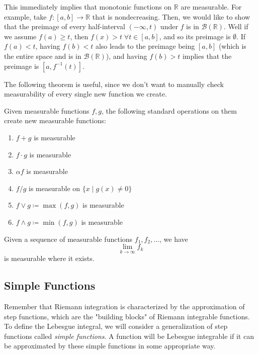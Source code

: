   This immediately implies that monotonic functions on $\mathbb{R}$ are measurable. For example, take $f: [a, b] \longrightarrow \mathbb{R}$ that is nondecreasing. Then, we would like to show that the preimage of every half-interval $(-\infty, t)$ under $f$ is in $\mathcal{B}(\mathbb{R})$. Well if we assume $f(a) \geq t$, then $f(x) > t \; \forall t \in [a, b]$, and so its preimage is $\emptyset$. If $f(a) < t$, having $f(b) < t$ also leads to the preimage being $[a, b]$ (which is the entire space and is in $\mathcal{B}(\mathbb{R})$), and having $f(b) > t$ implies that the preimage is $[a, f^{-1}(t)]$. 

  The following theorem is useful, since we don't want to manually check measurability of every single new function we create. 

  \begin{theorem}
    Given measurable functions $f, g$, the following standard operations on them create new measurable functions: 
    \begin{enumerate}
      \item $f + g$ is measurable 
      \item $f \cdot g$ is measurable 
      \item $\alpha f$ is measurable 
      \item $f / g$ is measurable on $\{x \mid g(x) \neq 0\}$ 
      \item $f \vee g \coloneqq \max (f, g)$ is measurable 
      \item $f \wedge g \coloneqq \min (f, g)$ is measurable 
    \end{enumerate}
  \end{theorem}

  \begin{theorem}
    Given a sequence of measurable functions $f_1, f_2, \ldots$, we have 
    \begin{equation}
      \lim_{k \rightarrow \infty} f_k
    \end{equation}
    is measurable where it exists. 
  \end{theorem}

\subsection{Simple Functions}

  Remember that Riemann integration is characterized by the approximation of step functions, which are the "building blocks" of Riemann integrable functions. To define the Lebesgue integral, we will consider a generalization of step functions called \textit{simple functions}. A function will be Lebesgue integrable if it can be approximated by these simple functions in some appropriate way. 

